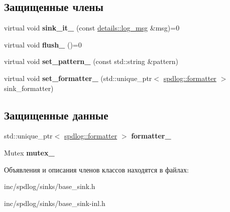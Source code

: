 \subsection*{Защищенные члены}
\begin{DoxyCompactItemize}
\item 
\mbox{\label{classspdlog_1_1sinks_1_1base__sink_ad698d300cb7f5e58b2aa1b9907cdbd87}} 
virtual void {\bfseries sink\+\_\+it\+\_\+} (const \hyperlink{structspdlog_1_1details_1_1log__msg}{details\+::log\+\_\+msg} \&msg)=0
\item 
\mbox{\label{classspdlog_1_1sinks_1_1base__sink_a5ac2b237c60f68a18122a1ca09b812b4}} 
virtual void {\bfseries flush\+\_\+} ()=0
\item 
\mbox{\label{classspdlog_1_1sinks_1_1base__sink_a9541fb9838aab62beb55f47ed1a143c6}} 
virtual void {\bfseries set\+\_\+pattern\+\_\+} (const std\+::string \&pattern)
\item 
\mbox{\label{classspdlog_1_1sinks_1_1base__sink_a008a9629bb406f0ca4a4e70e891a5630}} 
virtual void {\bfseries set\+\_\+formatter\+\_\+} (std\+::unique\+\_\+ptr$<$ \hyperlink{classspdlog_1_1formatter}{spdlog\+::formatter} $>$ sink\+\_\+formatter)
\end{DoxyCompactItemize}
\subsection*{Защищенные данные}
\begin{DoxyCompactItemize}
\item 
\mbox{\label{classspdlog_1_1sinks_1_1base__sink_a2db2479b1d1aed70f55c08a9392b5a42}} 
std\+::unique\+\_\+ptr$<$ \hyperlink{classspdlog_1_1formatter}{spdlog\+::formatter} $>$ {\bfseries formatter\+\_\+}
\item 
\mbox{\label{classspdlog_1_1sinks_1_1base__sink_a929422554ce18d8bffd9b4d75cc7acf3}} 
Mutex {\bfseries mutex\+\_\+}
\end{DoxyCompactItemize}


Объявления и описания членов классов находятся в файлах\+:\begin{DoxyCompactItemize}
\item 
inc/spdlog/sinks/base\+\_\+sink.\+h\item 
inc/spdlog/sinks/base\+\_\+sink-\/inl.\+h\end{DoxyCompactItemize}
